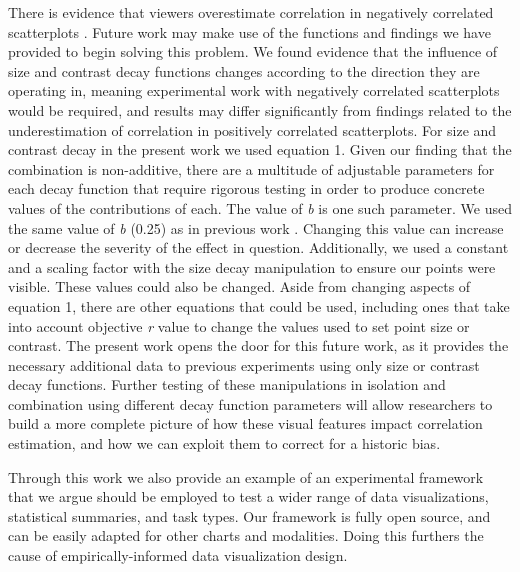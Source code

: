 \documentclass[manuscript, review, anonymous, screen]{acmart}
\begin{document}
There is evidence that viewers overestimate correlation in negatively
correlated scatterplots \citep{sher_2017}. Future work may make use of
the functions and findings we have provided to begin solving this
problem. We found evidence that the influence of size and contrast decay
functions changes according to the direction they are operating in,
meaning experimental work with negatively correlated scatterplots would
be required, and results may differ significantly from findings related
to the underestimation of correlation in positively correlated
scatterplots. For size and contrast decay in the present work we used
equation 1. Given our finding that the combination is non-additive,
there are a multitude of adjustable parameters for each decay function
that require rigorous testing in order to produce concrete values of the
contributions of each. The value of \emph{b} is one such parameter. We
used the same value of \emph{b} (0.25) as in previous work
\citep{strain_2023, strain_2023b}. Changing this value can increase or
decrease the severity of the effect in question. Additionally, we used a
constant and a scaling factor with the size decay manipulation to ensure
our points were visible. These values could also be changed. Aside from
changing aspects of equation 1, there are other equations that could be
used, including ones that take into account objective \emph{r} value to
change the values used to set point size or contrast. The present work
opens the door for this future work, as it provides the necessary
additional data to previous experiments using only size
\citep{strain_2023b} or contrast \citep{strain_2023} decay functions.
Further testing of these manipulations in isolation and combination
using different decay function parameters will allow researchers to
build a more complete picture of how these visual features impact
correlation estimation, and how we can exploit them to correct for a
historic bias.

Through this work we also provide an example of an experimental
framework that we argue should be employed to test a wider range of data
visualizations, statistical summaries, and task types. Our framework is
fully open source, and can be easily adapted for other charts and
modalities. Doing this furthers the cause of empirically-informed data
visualization design.




\end{document}
